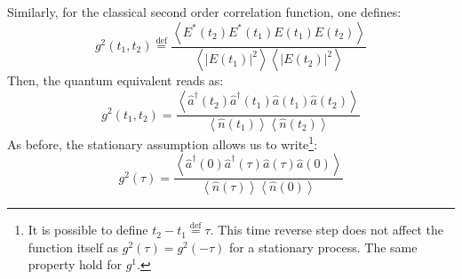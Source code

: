 \documentclass[11pt]{report}
\begin{document}
Similarly, for the classical second order correlation function, one defines:
\begin{equation}
{\displaystyle g ^{2}(t_{1},t_{2})\stackrel{\text{def}}{=}{\frac {\left\langle E^{*}(t_{2})E^{*}(t_{1})E(t_{1})E(t_{2})\right\rangle }{\left\langle \left|E(t_{1})\right|^{2}\right\rangle \left\langle \left|E(t_{2})\right|^{2}\right\rangle}}}
\end{equation}
Then, the quantum equivalent reads as:
\begin{equation}
{\displaystyle g ^{2}(t_1, t_2)={\frac {\left\langle \hat{a}^\dagger(t_2)\hat{a}^\dagger(t_1)\hat{a}(t_1)\hat{a}(t_2)\right\rangle }{\left\langle \hat{n}(t_1) \right\rangle \left\langle \hat{n}(t_2) \right\rangle}}}
\end{equation}
As before, the stationary assumption allows us to write\footnote{It is possible to define $t_2 - t_1 \stackrel{\text{def}}{=} \tau$. This time reverse step does not affect the function itself as $g^2(\tau) = g^2(-\tau)$ for a stationary process. The same property hold for $g^1$.}:
\begin{equation}
{\displaystyle g ^{2}(\tau)={\frac {\left\langle \hat{a}^\dagger(0)\hat{a}^\dagger(\tau)\hat{a}(\tau)\hat{a}(0)\right\rangle }{\left\langle \hat{n}(\tau) \right\rangle \left\langle \hat{n}(0) \right\rangle}}}
\end{equation}
\end{document}
